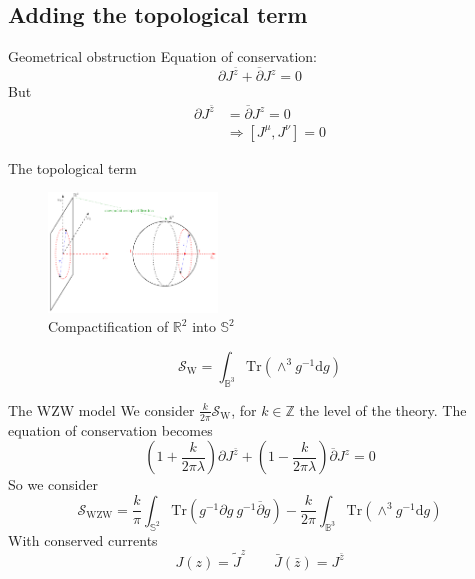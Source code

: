 \documentclass{beamer}
\begin{document}
\subsection{Adding the topological term}


\begin{frame}{Geometrical obstruction}\LARGE
    Equation of conservation:
    \begin{equation}
        \partial J^{\bar{z}} + \overline{\partial}J^z = 0
    \end{equation}
    But
    \alert{\begin{equation}
        \begin{aligned}
            \partial J^{\bar{z}} &= \overline{\partial}J^z = 0 \\
            & \Rightarrow [J^\mu, J^\nu] = 0
        \end{aligned}
    \end{equation}} 
\end{frame}

\begin{frame}{The topological term}
    \begin{figure}
        \centering
        \includegraphics[width=0.4\textwidth]{compactification}
        \caption{Compactification of $\mathbb{R}^2$ into $\mathbb{S}^2$}
    \end{figure}
    \begin{equation}
        \mathcal{S}_{\text{W}} = \int_{\mathbb{B}^3}\text{Tr}(\wedge^3 g^{-1}\text{d} g)
    \end{equation}
\end{frame}

\begin{frame}{The WZW model}
    We consider $\frac{k}{2\pi}\mathcal{S}_{\text{W}}$, for $k\in \mathbb{Z}$ the \alert{level of the theory}. The equation of conservation becomes
    \begin{equation}
        \left(1 + \frac{k}{2\pi \lambda}\right) \partial J^{\bar{z}} + \left(1 - \frac{k}{2\pi \lambda}\right) \overline{\partial}J^z = 0
    \end{equation}
    So we consider
    \begin{equation}
        \mathcal{S}_{\text{WZW}} = \frac{k}{\pi}\int_{\mathbb{S}^2} \text{Tr}(g^{-1}\partial g~ g^{-1}\overline{\partial}g) - \frac{k}{2\pi}\int_{\mathbb{B}^3}\text{Tr}(\wedge^3 g^{-1}\text{d}g)
    \end{equation}
    With conserved currents
    \begin{equation}
        J(z) = \tilde{J}^z \qquad \bar{J}(\bar{z}) = J^{\bar{z}}
    \end{equation}
\end{frame}
\end{document}
